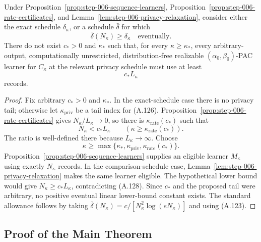 \begin{proposition}
\label{prop:step-006-omega-contradiction}
Under Proposition~\ref{prop:step-006-sequence-learners},
Proposition~\ref{prop:step-006-rate-certificates}, and
Lemma~\ref{lem:step-006-privacy-relaxation}, consider either the exact
schedule \(\delta_\kappa\), or a schedule \(\bar\delta\) for which
\[
\bar\delta(N_\kappa)\geq\delta_\kappa
\quad\text{eventually}.
\tag{A.126}
\]
There do not exist \(c_*>0\) and \(\kappa_*\) such that, for every
\(\kappa\geq\kappa_*\), every arbitrary-output, computationally
unrestricted, distribution-free realizable
\((\alpha_0,\beta_0)\)-PAC learner for \(C_\kappa\) at the relevant
privacy schedule must use at least
\[
c_*L_\kappa
\tag{A.127}
\]
records.
\end{proposition}

\begin{proof}
Fix arbitrary \(c_*>0\) and \(\kappa_*\).  In the exact-schedule case
there is no privacy tail; otherwise let
\(\kappa_{\mathrm{priv}}\) be a tail index for (A.126).
Proposition~\ref{prop:step-006-rate-certificates} gives
\(N_\kappa/L_\kappa\to0\), so there is
\(\kappa_{\mathrm{rate}}(c_*)\) such that
\[
N_\kappa<c_*L_\kappa
\qquad
(\kappa\geq\kappa_{\mathrm{rate}}(c_*)).
\tag{A.128}
\]
The ratio is well-defined there because \(L_\kappa\to\infty\).
Choose
\[
\kappa\geq
\max\{\kappa_*,\kappa_{\mathrm{priv}},
\kappa_{\mathrm{rate}}(c_*)\}.
\tag{A.129}
\]
Proposition~\ref{prop:step-006-sequence-learners} supplies an eligible
learner \(M_\kappa\) using exactly \(N_\kappa\) records.  In the
comparison-schedule case,
Lemma~\ref{lem:step-006-privacy-relaxation} makes the same learner
eligible.  The hypothetical lower bound would give
\(N_\kappa\geq c_*L_\kappa\), contradicting (A.128).
Since \(c_*\) and the proposed tail were arbitrary, no positive
eventual linear lower-bound constant exists.  The standard allowance
follows by taking
\(\bar\delta(N_\kappa)=
c/[N_\kappa^2\log(eN_\kappa)]\) and using (A.123).
\end{proof}

\subsection{Proof of the Main Theorem}\label{app:main-proof}

